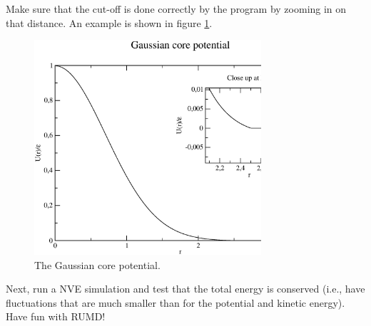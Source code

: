 Make sure that the cut-off is done correctly by the program by zooming in on that distance. An example is shown in figure \ref{Gauss}. 
\begin{figure}[!ht]
\centering
\includegraphics[width=0.75\textwidth]{level3/GCpotential}
\caption{The Gaussian core potential.}\label{Gauss}
\end{figure}
Next, run a NVE simulation and test that the total energy is conserved (i.e., have fluctuations that are much smaller 
than for the potential and kinetic energy). 
\newline \newline 
Have fun with RUMD!

%
